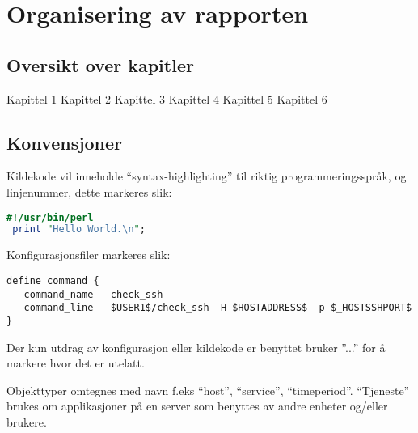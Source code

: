 \section{Organisering av rapporten}
		\subsection{Oversikt over kapitler}
Kapittel 1
Kapittel 2
Kapittel 3
Kapittel 4
Kapittel 5
Kapittel 6
\subsection{Konvensjoner} %

Kildekode vil inneholde ``syntax-highlighting'' til riktig programmeringsspråk, og linjenummer, dette markeres slik:
\begin{lstlisting}[language=perl]
 #!/usr/bin/perl
 print "Hello World.\n";
\end{lstlisting}

Konfigurasjonsfiler markeres slik:
\begin{lstlisting}[style=example]
define command {
   command_name   check_ssh
   command_line   $USER1$/check_ssh -H $HOSTADDRESS$ -p $_HOSTSSHPORT$
}
\end{lstlisting}

Der kun utdrag av konfigurasjon eller kildekode er benyttet bruker ''...'' for å markere hvor det er utelatt.

Objekttyper omtegnes med navn f.eks ``host'', ``service'', ``timeperiod''. ``Tjeneste'' brukes om applikasjoner på en server som benyttes av andre enheter og/eller brukere. 
